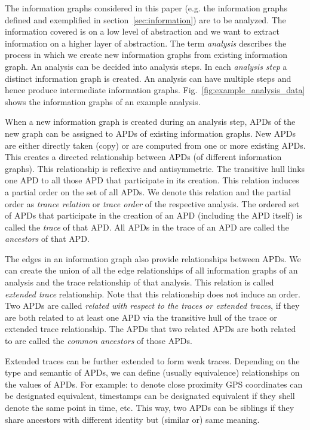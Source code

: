 The information graphs considered in this paper (e.g. the information graphs defined and exemplified in section~\ref{sec:information}) are to be analyzed. The information covered is on a low level of abstraction and we want to extract information on a higher layer of abstraction. The term \emph{analysis} describes the process in which we create new information graphs from existing information graph. An analysis can be decided into analysis steps. In each \emph{analysis step} a distinct information graph is created. An analysis can have multiple steps and hence produce intermediate information graphs. Fig.~\ref{fig:example_analysis_data} shows the information graphs of an example analysis.

When a new information graph is created during an analysis step, APDs of the new graph can be assigned to APDs of existing information graphs. New APDs are either directly taken (copy) or are computed from one or more existing APDs. This creates a directed relationship between APDs (of different information graphs). This relationship is reflexive and antisymmetric. The transitive hull links one APD to all those APD that participate in its creation. This relation induces a partial order on the set of all APDs. We denote this relation and the partial order as \emph{trance relation} or \emph{trace order} of the respective analysis. The ordered set of APDs that participate in the creation of an APD (including the APD itself) is called the \emph{trace} of that APD. All APDs in the trace of an APD are called the \emph{ancestors} of that APD.

The edges in an information graph also provide relationships between APDs. We can create the union of all the edge relationships of all information graphs of an analysis and the trace relationship of that analysis. This relation is called \emph{extended trace} relationship. Note that this relationship does not induce an order. Two APDs are called \emph{related with respect to the traces or extended traces}, if they are both related to at least one APD via the transitive hull of the trace or extended trace relationship. The APDs that two related APDs are both related to are called the \emph{common ancestors} of those APDs. 

Extended traces can be further extended to form weak traces. Depending on the type and semantic of APDs, we can define (usually equivalence) relationships on the values of APDs. For example: to denote close proximity GPS coordinates can be designated equivalent, timestamps can be designated equivalent if they shell denote the same point in time, etc. This way, two APDs can be siblings if they share ancestors with different identity but (similar or) same meaning.

